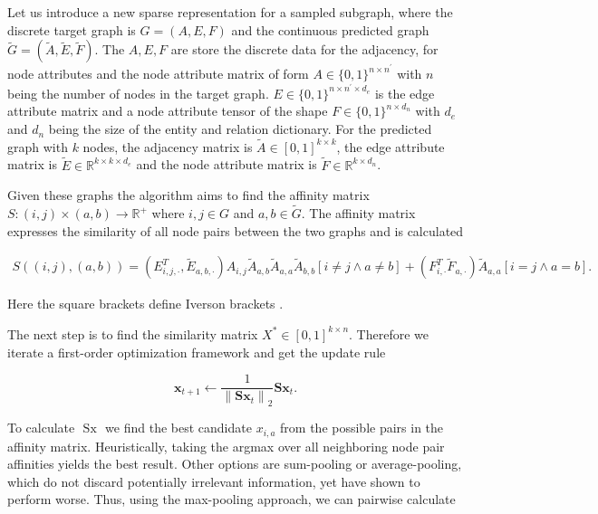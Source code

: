 {%
Let us introduce a new sparse representation for a sampled subgraph, where the discrete target graph is $G=(A, E, F)$ and the continuous predicted graph $\widetilde{G}=(\widetilde{A}, \widetilde{E}, \widetilde{F})$. The $A, E, F$ are store the discrete data for the adjacency, for node attributes and the node attribute matrix of form $A \in\{0,1\}^{n \times n^{\prime}}$ with $n$ being the number of nodes in the target graph. $E\in\{0,1\}^{n \times n^{\prime} \times d_e}$ is the edge attribute matrix and a node attribute tensor of the shape $F\in\{0,1\}^{n \times d_n}$ with $d_e$ and $d_n$ being the size of the entity and relation dictionary. For the predicted graph with $k$ nodes, the adjacency matrix is $\widetilde{A} \in[0,1]^{k \times k}$, the edge attribute matrix is $\widetilde{E} \in \mathbb{R}^{k \times k \times d_{e}}$ and the node attribute matrix is $\widetilde{F} \in \mathbb{R}^{k \times d_{n}}$.


Given these graphs the algorithm aims to find the affinity matrix $S:(i, j) \times(a, b) \rightarrow \mathbb{R}^{+}$ where $i, j \in G$ and $a, b \in \widetilde{G}$. The affinity matrix expresses the similarity of all node pairs between the two graphs and is calculated 

\begin{equation}
    \begin{array}{l}
        S((i, j),(a, b)) = \left(E_{i, j, \cdot}^{T}, \widetilde{E}_{a, b, \cdot}\right) A_{i, j} \widetilde{A}_{a, b} \widetilde{A}_{a, a} \widetilde{A}_{b, b}[i \neq j \wedge a \neq b] + \left(F_{i, \cdot}^{T} \widetilde{F}_{a, \cdot}\right) \widetilde{A}_{a, a}[i=j \wedge a=b].
    \end{array}
\label{eq3:s}
\end{equation}

Here the square brackets define Iverson brackets \cite{simonovsky_graphvae_2018}.


The next step is to find the similarity matrix $X^* \in[0,1]^{k \times n}$. Therefore we iterate a first-order optimization framework and get the update rule

\begin{equation}
    \mathbf{x}_{t+1} \leftarrow \frac{1}{\left\|\mathbf{S} \mathbf{x}_{t}\right\|_{2}} \mathbf{S} \mathbf{x}_{t}.
\end{equation}

To calculate $\text { Sx }$ we find the best candidate $x_{i,a}$ from the possible pairs in the affinity matrix. Heuristically, taking the argmax over all neighboring node pair affinities yields the best result. Other options are sum-pooling or average-pooling, which do not discard potentially irrelevant information, yet have shown to perform worse. Thus, using the max-pooling approach, we can pairwise calculate

}
